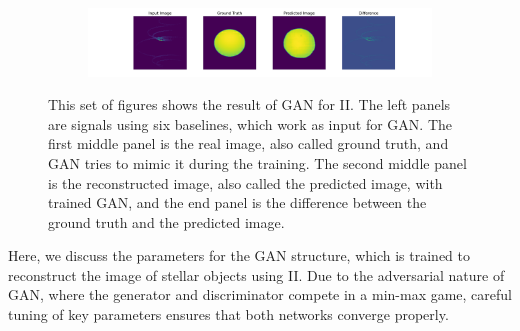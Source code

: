 \begin{figure}
\begin{subfigure}{\linewidth}
	\end{subfigure}
	\begin{subfigure}{\linewidth}
		\includegraphics[width=\linewidth]{fig/testing_image/image_47.png}
	\end{subfigure}
	\caption{This set of figures shows the result of GAN for II. The left panels are signals using six baselines, which work as input for GAN. The first middle panel is the real image, also called ground truth, and GAN tries to mimic it during the training. The second middle panel is the reconstructed image, also called the predicted image, with trained GAN, and the end panel is the difference between the ground truth and the predicted image.}
	\label{fig:GAN}
\end{figure}
Here, we discuss the parameters for the GAN structure, which is trained to reconstruct the image of stellar objects using II. Due to the adversarial nature of GAN, where the generator and discriminator compete in a min-max game, careful tuning of key parameters ensures that both networks converge properly.


